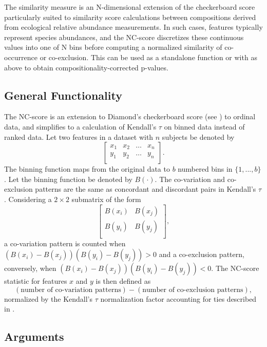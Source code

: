 \documentclass{article}\usepackage[]{graphicx}\usepackage[usenames,dvipsnames]{color}
\begin{document}
The  similarity measure is an N-dimensional extension of the checkerboard score particularly suited to similarity score calculations between compositions derived from ecological relative abundance measurements.  In such cases, features typically represent species abundances, and the NC-score discretizes these continuous values into one of N bins before computing a normalized similarity of co-occurrence or co-exclusion.  This can be used as a standalone function or with  as above to obtain compositionality-corrected p-values.

\subsection{General Functionality}

The NC-score is an extension to Diamond's checkerboard score (see \citet{cody1975ecology}) to ordinal data, and simplifies to a calculation of Kendall's $\tau$ on binned data instead of ranked data.  Let two features in a dataset with $n$ subjects be denoted by
\[
\left[ \begin{array}{cccc}
    x_1 & x_2 & \dots & x_n\\
    y_1 & y_2 & \dots & y_n\\
    \end{array} \right].
\]
The binning function maps from the original data to $b$ numbered bins in $\{1,...,b\}$.  Let the binning function be denoted by $B(\cdot)$. The co-variation and co-exclusion patterns are the same as concordant and discordant pairs in Kendall's $\tau$.  Considering a $2 \times 2$ submatrix of the form
\[
\left[ \begin{array}{cc}
    B(x_i) & B(x_j)\\
    B(y_i) & B(y_j)\\
    \end{array} \right],
\]
a co-variation pattern is counted when $(B(x_i) - B(x_j))(B(y_i) - B(y_j)) > 0$ and a co-exclusion pattern, conversely, when $(B(x_i) - B(x_j))(B(y_i) - B(y_j)) < 0$.  The NC-score statistic for features $x$ and $y$ is then defined as 
\[
(\text{number of co-variation patterns}) - (\text{number of co-exclusion patterns}),
\]
normalized by the Kendall's $\tau$ normalization factor accounting for ties described in \citet{kendall1970}.

\subsection{Arguments}
\end{document}
